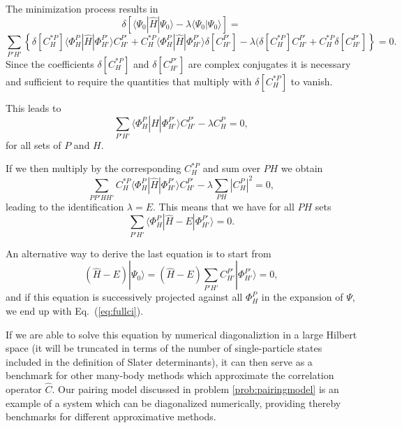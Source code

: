 The minimization process results in 
\[
\delta\left[ \langle \Psi_0 | \hat{H} |\Psi_0 \rangle-\lambda \langle \Psi_0 |\Psi_0 \rangle\right]=
\]
\[
\sum_{P'H'}\left\{\delta[C_H^{*P}]\langle \Phi_H^P | \hat{H} |\Phi_{H'}^{P'} \rangle C_{H'}^{P'}+
C_H^{*P}\langle \Phi_H^P | \hat{H} |\Phi_{H'}^{P'} \rangle \delta[C_{H'}^{P'}]-
\lambda( \delta[C_H^{*P}]C_{H'}^{P'}+C_H^{*P}\delta[C_{H'}^{P'}]\right\} = 0.
\]
Since the coefficients $\delta[C_H^{*P}]$ and $\delta[C_{H'}^{P'}]$ are complex conjugates it is necessary and sufficient to require the quantities that multiply with $\delta[C_H^{*P}]$ to vanish.  

This leads to 
\[
\sum_{P'H'}\langle \Phi_H^P | \hat{H} |\Phi_{H'}^{P'} \rangle C_{H'}^{P'}-\lambda C_H^{P}=0,
\]
for all sets of $P$ and $H$.

If we then multiply by the corresponding $C_H^{*P}$ and sum over $PH$ we obtain
\[ 
\sum_{PP'HH'}C_H^{*P}\langle \Phi_H^P | \hat{H} |\Phi_{H'}^{P'} \rangle C_{H'}^{P'}-\lambda\sum_{PH}|C_H^P|^2=0,
\]
leading to the identification $\lambda = E$. This means that we have for all $PH$ sets
\begin{equation}
\sum_{P'H'}\langle \Phi_H^P | \hat{H} -E|\Phi_{H'}^{P'} \rangle = 0. \label{eq:fullci}
\end{equation}



An alternative way to derive the last equation is to start from 
\[
(\hat{H} -E)|\Psi_0\rangle = (\hat{H} -E)\sum_{P'H'}C_{H'}^{P'}|\Phi_{H'}^{P'} \rangle=0, 
\]
and if this equation is successively projected against all $\Phi_H^P$ in the expansion of $\Psi$, we end up with Eq.~(\ref{eq:fullci}).

If we are able to solve this equation by numerical diagonaliztion
in a large Hilbert space (it will be truncated in terms of the number of single-particle states included in the definition
of Slater determinants), it can then serve as a benchmark for other many-body methods which approximate the correlation operator
$\hat{C}$.  Our pairing model discussed in problem \ref{prob:pairingmodel} is an example of a system which can be diagonalized numerically, providing thereby benchmarks for different approximative methods. 


